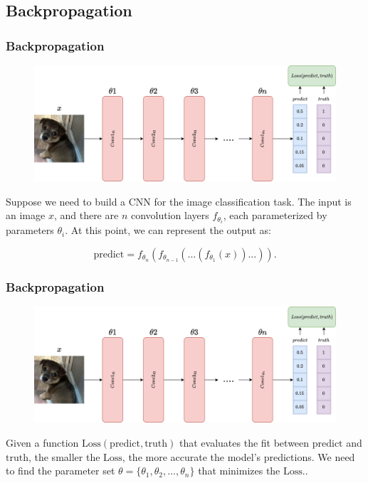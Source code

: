 \documentclass{beamer}
\begin{document}
    \subsection{Backpropagation}
    
    \begin{frame}
    	\frametitle{Backpropagation}
    	\begin{figure}
    		\centering
    		\includegraphics[width=0.8\linewidth]{src/backprop.drawio.png}
    	\end{figure}
    	
    	\justifying
    	Suppose we need to build a CNN for the image classification task. The input is an image \( x \), and there are \( n \) convolution layers \( f_\theta_i \), each parameterized by parameters \( \theta _i \). At this point, we can represent the output as:
    	
    	\[
    	\text{predict} = f_{\theta_n}(f_{\theta_{n-1}}(...(f_{\theta_1}(x))...)).
    	\]
    	
    \end{frame}
    
    \begin{frame}
    	\frametitle{Backpropagation}
    	\begin{figure}
    		\centering
    		\includegraphics[width=0.8\linewidth]{src/backprop.drawio.png}
    	\end{figure}
    	
    	\justifying
    	Given a function \( \text{Loss}(\text{predict}, \text{truth}) \) that evaluates the fit between \( \text{predict} \) and \( \text{truth} \), the smaller the \( \text{Loss} \), the more accurate the model's predictions. We need to find the parameter set \( \theta = \{ \theta_1, \theta_2, \ldots, \theta_n \} \) that minimizes the \( \text{Loss} \)..
    	
    \end{frame}
    
\end{document}
